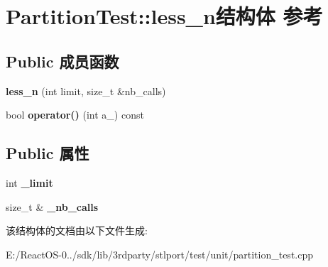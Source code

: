 \hypertarget{struct_partition_test_1_1less__n}{}\section{Partition\+Test\+:\+:less\+\_\+n结构体 参考}
\label{struct_partition_test_1_1less__n}
\subsection*{Public 成员函数}
\begin{DoxyCompactItemize}
\item 
\mbox{\label{struct_partition_test_1_1less__n_aec583e9d05e22f67409fc422475e6a02}} 
{\bfseries less\+\_\+n} (int limit, size\+\_\+t \&nb\+\_\+calls)
\item 
\mbox{\label{struct_partition_test_1_1less__n_a3d18515382046d0657590d38af532604}} 
bool {\bfseries operator()} (int a\+\_\+) const
\end{DoxyCompactItemize}
\subsection*{Public 属性}
\begin{DoxyCompactItemize}
\item 
\mbox{\label{struct_partition_test_1_1less__n_a7cf6d0032b059351d40e0600c0446cf5}} 
int {\bfseries \+\_\+limit}
\item 
\mbox{\label{struct_partition_test_1_1less__n_a397f2c881843b385f2664dd7780ea806}} 
size\+\_\+t \& {\bfseries \+\_\+nb\+\_\+calls}
\end{DoxyCompactItemize}


该结构体的文档由以下文件生成\+:\begin{DoxyCompactItemize}
\item 
E\+:/\+React\+O\+S-\/0../sdk/lib/3rdparty/stlport/test/unit/partition\+\_\+test.\+cpp\end{DoxyCompactItemize}
